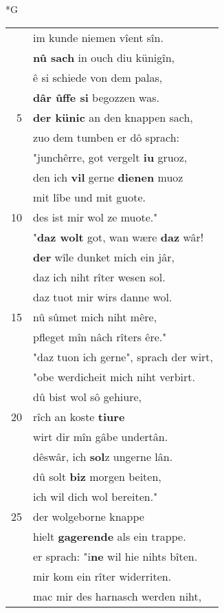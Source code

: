 \documentclass[8pt,a4paper,notitlepage]{article}
\begin{document}
\begin{table}[ht]
\begin{minipage}[t]{0.5\linewidth}
\small
\begin{center}*G
\end{center}
\begin{tabular}{rl}
 & im kunde niemen vîent sîn.\\ 
 & \textbf{nû sach} in ouch diu künigîn,\\ 
 & ê si schiede von dem palas,\\ 
 & \textbf{dâr ûffe si} begozzen was.\\ 
5 & \textbf{der künic} an den knappen sach,\\ 
 & zuo dem tumben er dô sprach:\\ 
 & "junchêrre, got vergelt \textbf{iu} gruoz,\\ 
 & den ich \textbf{vil} gerne \textbf{dienen} muoz\\ 
 & mit lîbe und mit guote.\\ 
10 & des ist mir wol ze muote."\\ 
 & "\textbf{daz wolt} got, wan wære \textbf{daz} wâr!\\ 
 & \textbf{der} wîle dunket mich ein jâr,\\ 
 & daz ich niht rîter wesen sol.\\ 
 & daz tuot mir wirs danne wol.\\ 
15 & nû sûmet mich niht mêre,\\ 
 & pfleget mîn nâch rîters êre."\\ 
 & "daz tuon ich gerne", sprach der wirt,\\ 
 & "obe werdicheit mich niht verbirt.\\ 
 & dû bist wol sô gehiure,\\ 
20 & rîch an koste \textbf{tiure}\\ 
 & wirt dir mîn gâbe undertân.\\ 
 & dêswâr, ich \textbf{sol}z ungerne lân.\\ 
 & dû solt \textbf{biz} morgen beiten,\\ 
 & ich wil dich wol bereiten."\\ 
25 & der wolgeborne knappe\\ 
 & hielt \textbf{gagerende} als ein trappe.\\ 
 & er sprach: "i\textbf{ne} wil hie nihts bîten.\\ 
 & mir kom ein rîter widerriten.\\ 
 & mac mir des harnasch werden niht,\\ 

\end{tabular}
\end{minipage}
\end{table}
\end{document}
